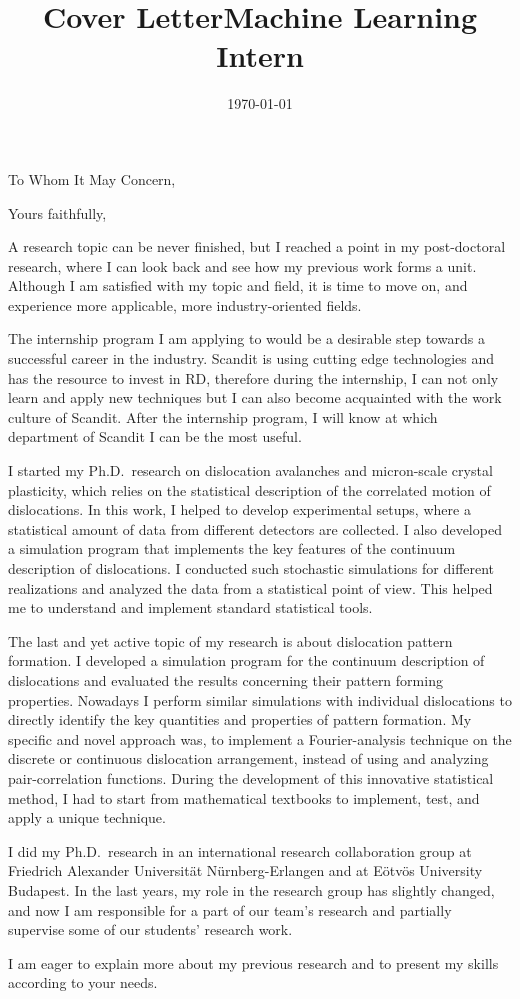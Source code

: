 \documentclass[11pt,a4paper,sans]{moderncv}        %
\title{Cover Letter\newline Machine Learning Intern}                               %
\begin{document}
\date{\today}
\opening{To Whom It May Concern,}
\closing{Yours faithfully,}
\makelettertitle

A research topic can be never finished, but I reached a point in my post-doctoral research, where I can look back and see how my previous work forms a unit. Although I am satisfied with my topic and field, it is time to move on, and experience more applicable, more industry-oriented fields.

The internship program I am applying to would be a desirable step towards a successful career in the industry. Scandit is using cutting edge technologies and has the resource to invest in RD, therefore during the internship, I can not only learn and apply new techniques but I can also become acquainted with the work culture of Scandit. After the internship program, I will know at which department of Scandit I can be the most useful.

I started my Ph.D.\ research on dislocation avalanches and micron-scale crystal plasticity, which relies on the statistical description of the correlated motion of dislocations. In this work, I helped to develop experimental setups, where a statistical amount of data from different detectors are collected. I also developed a simulation program that implements the key features of the continuum description of dislocations. I conducted such stochastic simulations for different realizations and analyzed the data from a statistical point of view. This helped me to understand and implement standard statistical tools.

The last and yet active topic of my research is about dislocation pattern formation. I developed a simulation program for the continuum description of dislocations and evaluated the results concerning their pattern forming properties. Nowadays I perform similar simulations with individual dislocations to directly identify the key quantities and properties of pattern formation. My specific and novel approach was, to implement a Fourier-analysis technique on the discrete or continuous dislocation arrangement, instead of using and analyzing pair-correlation functions. During the development of this innovative statistical method, I had to start from mathematical textbooks to implement, test, and apply a unique technique. 

I did my Ph.D.\ research in an international research collaboration group at Friedrich Alexander Universität Nürnberg-Erlangen and at Eötvös University Budapest. In the last years, my role in the research group has slightly changed, and now I am responsible for a part of our team’s research and partially supervise some of our students’ research work.

I am eager to explain more about my previous research and to present my skills according to your needs.

\makeletterclosing
\end{document}

